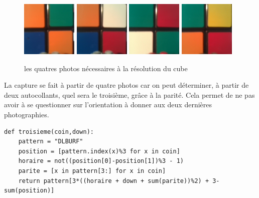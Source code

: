 \documentclass[11pt,a4paper]{article}
\begin{document}
\begin{figure}[h]
	\centering
	\includegraphics[scale=0.4]{cube0}
	\includegraphics[scale=0.4]{cube1}
	\includegraphics[scale=0.4]{cube2}
	\includegraphics[scale=0.4]{cube3}
	\caption{les quatres photos nécessaires à la résolution du cube}
\end{figure}
    La capture se fait à partir de quatre photos car on peut déterminer, à partir de deux autocollants, quel sera le troisième, grâce à la parité. 
Cela permet de ne pas avoir à se questionner sur l'orientation à donner aux deux dernières photographies.
\begin{lstlisting}
def troisieme(coin,down):
    pattern = "DLBURF"
    position = [pattern.index(x)%3 for x in coin]
    horaire = not((position[0]-position[1])%3 - 1)
    parite = [x in pattern[3:] for x in coin]
    return pattern[3*((horaire + down + sum(parite))%2) + 3-sum(position)]
\end{lstlisting}
\end{document}
